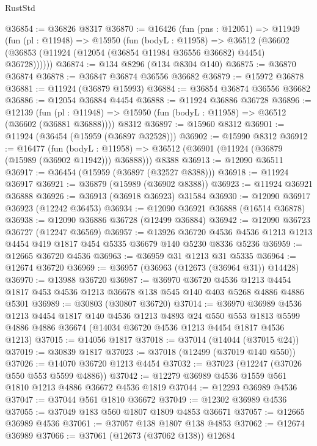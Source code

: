 \begin{lexlean}{RustStd}
\begin{coremodule}
{\begin{coremodule}
{{{{{{{{{{{{{{{{{{{{{{{{{{{{{{{{{{{{{{{{{{{{{{{{{{{{{{{{{{{{{{{{{{{{{{{{{{{{{{{{@36854 := @36826 @8317
@36870 := @16426
    (fun (pns : @12051) =>
    @11949
      (fun (pl : @11948) =>
      @15950
        (fun (bodyL : @11958) =>
        @36512 (@36602 (@36853 (@11924 (@12054 (@36854 @11984 @36556 @36682) @4454) @36728))))))
@36874 := @134 @8296 (@134 @8304 @140)
@36875 := @36870 @36874
@36878 := @36847 @36874 @36556 @36682
@36879 := @15972 @36878
@36881 := @11924 (@36879 @15993)
@36884 := @36854 @36874 @36556 @36682
@36886 := @12054 @36884 @4454
@36888 := @11924 @36886 @36728
@36896 := @12139
    (fun (pl : @11948) => @15950 (fun (bodyL : @11958) => @36512 (@36602 (@36881 @36888))))
    @8312
@36897 := @15960 @8312
@36901 := @11924 (@36454 (@15959 (@36897 @32528)))
@36902 := @15990 @8312
@36912 := @16477
    (fun (bodyL : @11958) => @36512 (@36901 (@11924 (@36879 (@15989 (@36902 @11942))) @36888)))
    @8388
@36913 := @12090 @36511
@36917 := @36454 (@15959 (@36897 (@32527 @8388)))
@36918 := @11924 @36917
@36921 := @36879 (@15989 (@36902 @8388))
@36923 := @11924 @36921 @36888
@36926 := @36913 (@36918 @36923) @31584
@36930 := @12090 @36917 @36923 (@12242 @36453)
@36934 := @12090 @36921 @36888 (@16514 @36878)
@36938 := @12090 @36886 @36728 (@12499 @36884)
@36942 := @12090 @36723 @36727 (@12247 @36569)
@36957 := @13926
    @36720
    @4536
    @4536
    @1213
    @1213
    @4454
    @419
    @1817
    @454
    @5335
    @36679
    @140
    @5230
    @8336
    @5236
@36959 := @12665 @36720 @4536
@36963 := @36959 @31 @1213 @31 @5335
@36964 := @12674 @36720
@36969 := @36957 (@36963 (@12673 (@36964 @31)) @14428)
@36970 := @13988 @36720
@36987 := @36970
    @36720
    @4536
    @1213
    @4454
    @1817
    @453
    @4536
    @1213
    @36678
    @138
    @545
    @140
    @403
    @5268
    @4886
    @4886
    @5301
@36989 := @30803 (@30807 @36720)
@37014 := @36970
    @36989
    @4536
    @1213
    @4454
    @1817
    @140
    @4536
    @1213
    @4893
    @24
    @550
    @553
    @1813
    @5599
    @4886
    @4886
    @36674
    (@14034 @36720 @4536 @1213 @4454 @1817 @4536 @1213)
@37015 := @14056 @1817
@37018 := @37014 (@14044 (@37015 @24))
@37019 := @30839 @1817
@37023 := @37018 (@12499 (@37019 @140 @550))
@37026 := @14070 @36720 @1213 @4454
@37032 := @37023 (@12247 (@37026 @550 @553 @5599 @4886))
@37042 := @12279 @36989 @4536 @1559 @561 @1810 @1213 @4886 @36672 @4536 @1819
@37044 := @12293 @36989 @4536
@37047 := @37044 @561 @1810 @36672
@37049 := @12302 @36989 @4536
@37055 := @37049 @183 @560 @1807 @1809 @4853 @36671
@37057 := @12665 @36989 @4536
@37061 := @37057 @138 @1807 @138 @4853
@37062 := @12674 @36989
@37066 := @37061 (@12673 (@37062 @138)) @12684
}}}}}}}}}}}}}}}}}}}}}}}}}}}}}}}}}}}}}}}}}}}}}}}}}}}}}}}}}}}}}}}}}}}}}}}}}}}}}}}}
\end{coremodule}}
\end{coremodule}
\end{lexlean}
